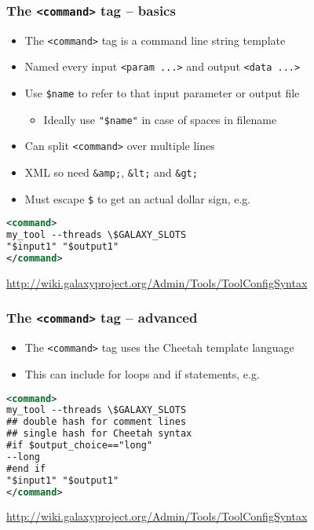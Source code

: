 \documentclass[table]{beamer}
\begin{document}
\begin{frame}[fragile]
\frametitle{The \texttt{<command>} tag -- basics}
\begin{itemize}
\item The \texttt{<command>} tag is a command line string template
\item Named every input \texttt{<param ...>} and output \texttt{<data ...>}
\item Use \texttt{\$name} to refer to that input parameter or output file
    \begin{itemize}
    \item Ideally use \texttt{"\$name"} in case of spaces in filename
    \end{itemize}    
\item Can split \texttt{<command>} over multiple lines
\item XML so need \texttt{\&amp;}, \texttt{\&lt;} and \texttt{\&gt;}
\item Must escape \texttt{\$} to get an actual dollar sign, e.g.
\end{itemize}
\vspace{3mm}
\begin{lstlisting}[language=xml]
<command>
my_tool --threads \$GALAXY_SLOTS
"$input1" "$output1"
</command>
\end{lstlisting}
\vspace{-3mm}
{\scriptsize \url{http://wiki.galaxyproject.org/Admin/Tools/ToolConfigSyntax}}
\end{frame}

\begin{frame}[fragile]
\frametitle{The \texttt{<command>} tag -- advanced}
\begin{itemize}
\item The \texttt{<command>} tag uses the Cheetah template language
\item This can include for loops and if statements, e.g.
\end{itemize}
\vspace{3mm}
\begin{lstlisting}[language=xml]
<command>
my_tool --threads \$GALAXY_SLOTS
## double hash for comment lines
## single hash for Cheetah syntax
#if $output_choice=="long"
--long
#end if
"$input1" "$output1"
</command>
\end{lstlisting}
\vspace{-3mm}
{\scriptsize \url{http://wiki.galaxyproject.org/Admin/Tools/ToolConfigSyntax}}
\end{frame}
\end{document}
